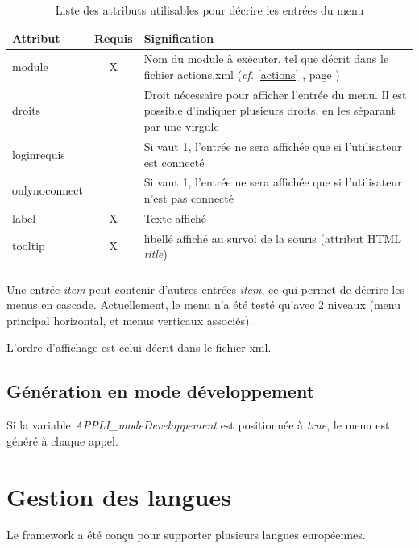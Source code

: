 \begin{longtable}{|p{2.5cm}|c|p{9cm}|}
\hline
\textbf{Attribut} & \textbf{Requis} & \textbf{Signification} \\
\hline
\endhead
module & X & Nom du module à exécuter, tel que décrit dans le fichier actions.xml (\textit{cf.} \ref{actions} \textit{\nameref{actions}}, page \pageref{actions})\\

droits & & Droit nécessaire pour afficher l'entrée du menu. Il est possible d'indiquer plusieurs droits, en les séparant par une virgule\\

loginrequis & & Si vaut 1, l'entrée ne sera affichée que si l'utilisateur est connecté \\

onlynoconnect & & Si vaut 1, l'entrée ne sera affichée que si l'utilisateur n'est pas connecté\\

label & X & Texte affiché\\

tooltip & X & libellé affiché au survol de la souris (attribut HTML \textit{title})\\
 \hline

\caption{Liste des attributs utilisables pour décrire les entrées du menu}
\end{longtable}

Une entrée \textit{item} peut contenir d'autres entrées \textit{item}, ce qui permet de décrire les menus en cascade. Actuellement, le menu n'a été testé qu'avec 2 niveaux (menu principal horizontal, et menus verticaux associés).

L'ordre d'affichage est celui décrit dans le fichier xml.

\section{Génération en mode développement}

Si la variable \textit{APPLI\_modeDeveloppement} est positionnée à \textit{true}, le menu est généré à chaque appel.

\chapter{Gestion des langues}\label{langue}

Le framework a été conçu pour supporter plusieurs langues européennes.

